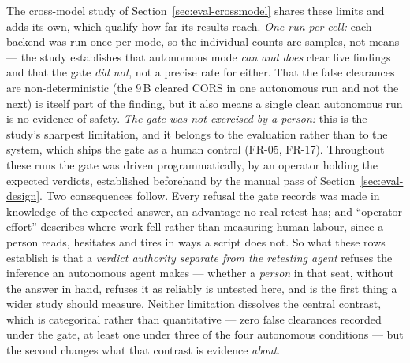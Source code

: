 The cross-model study of Section~\ref{sec:eval-crossmodel} shares these limits and adds
its own, which qualify how far its results reach. \emph{One run per cell:} each backend
was run once per mode, so the individual counts are samples, not means --- the study
establishes that autonomous mode \emph{can and does} clear live findings and that the
gate \emph{did not}, not a precise rate for either. That the false clearances are
non-deterministic (the 9\,B cleared CORS in one autonomous run and not the next) is
itself part of the finding, but it also means a single clean autonomous run is no
evidence of safety. \emph{The gate was not exercised by a person:} this is the study's
sharpest limitation, and it belongs to the evaluation rather than to the system, which
ships the gate as a human control (FR-05, FR-17). Throughout these runs the gate was
driven programmatically, by an operator holding the expected verdicts, established
beforehand by the manual pass of Section~\ref{sec:eval-design}. Two
consequences follow. Every refusal the gate records was made in knowledge of the expected
answer, an advantage no real retest has; and ``operator effort'' describes where work fell
rather than measuring human labour, since a person reads,
hesitates and tires in ways a script does not. So what these rows establish is that a
\emph{verdict authority separate from the retesting agent} refuses the inference an
autonomous agent makes --- whether a \emph{person} in that seat, without the answer in
hand, refuses it as reliably is untested here, and is the first thing a wider study should
measure. Neither limitation dissolves the central contrast, which is categorical rather
than quantitative --- zero false clearances recorded under the gate, at least one under
three of the four autonomous conditions --- but the second changes what that contrast is
evidence \emph{about}.

